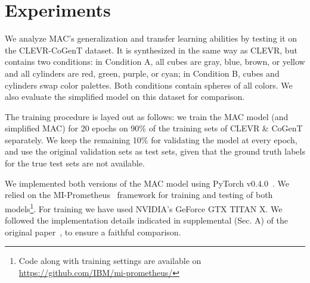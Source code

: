\section{Experiments}

We analyze MAC's generalization and transfer learning abilities by testing it on the CLEVR-CoGenT dataset. It is synthesized in the same way as CLEVR, but contains two conditions: in Condition A, all cubes are gray, blue, brown, or yellow and all cylinders are red, green, purple, or cyan; in Condition B, cubes and cylinders swap color palettes. Both conditions contain spheres of all colors. We also evaluate the simplified model on this dataset for comparison.

The training procedure is layed out as follows: we train the MAC model (and simplified MAC) for 20 epochs on 90\% of the training sets of CLEVR \& CoGenT separately. We keep the remaining 10\% for validating the model at every epoch, and use the original validation sets as test sets, given that the ground truth labels for the true test sets are not available.

We implemented both versions of the MAC model using PyTorch v0.4.0~\cite{paszke2017automatic}. We relied on the MI-Prometheus~\cite{kornuta2018accelerating} framework for training and testing of both models\footnote{Code along with training settings are available on \url{https://github.com/IBM/mi-prometheus/}}. For training we have used NVIDIA's GeForce GTX TITAN X. We followed the implementation details indicated in supplemental (Sec. A) of the original paper~\cite{hudson2018compositional}, to ensure a faithful comparison.

